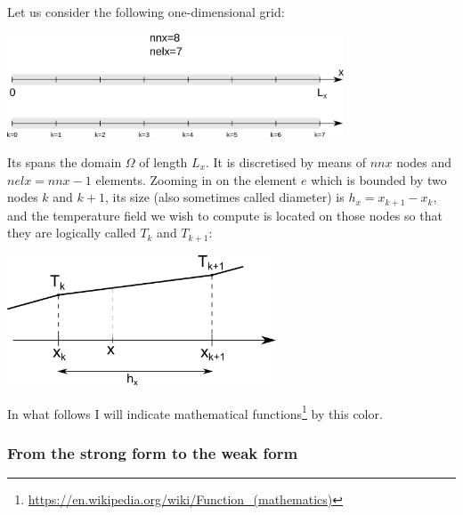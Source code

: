 
Let us consider the following one-dimensional grid: 
\begin{center}
\includegraphics[width=10cm]{images/oneD/domain}
\end{center}
Its spans the domain $\Omega$ of length $L_x$. 
It is discretised by means of 
$nnx$ nodes and $nelx=nnx-1$ elements.
Zooming in on the element $e$ which is bounded by two nodes $k$ and $k+1$,
its size (also sometimes called diameter) is $h_x=x_{k+1}-x_k$, 
and the temperature field we wish to compute is located on those 
nodes so that they are logically called $T_k$ and $T_{k+1}$:

\begin{center}
\includegraphics[width=8cm]{images/oneD/el1D}
\end{center}

\begin{remark}
In what follows I will indicate 
mathematical functions\footnote{\url{https://en.wikipedia.org/wiki/Function_(mathematics)}} 
by this {\color{Violet} color}.
\end{remark}

\subsubsection{From the strong form to the weak form}

